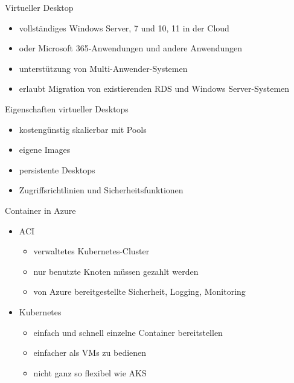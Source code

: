 \begin{flashcard}[]{Virtueller Desktop}
  \begin{itemize}
    \item vollständiges Windows Server, 7 und 10, 11 in der Cloud
    \item oder Microsoft 365-Anwendungen und andere Anwendungen
    \item unterstützung von Multi-Anwender-Systemen
    \item erlaubt Migration von existierenden RDS und Windows Server-Systemen
  \end{itemize}
\end{flashcard}

\begin{flashcard}[]{Eigenschaften virtueller Desktops}
  \begin{itemize}
    \item kostengünstig skalierbar mit Pools
    \item eigene Images
    \item persistente Desktops
    \item Zugriffsrichtlinien und Sicherheitsfunktionen
  \end{itemize}
\end{flashcard}


\begin{flashcard}[]{Container in Azure}
  \begin{itemize}
    \item ACI
      \begin{itemize}
        \item verwaltetes Kubernetes-Cluster
        \item nur benutzte Knoten müssen gezahlt werden
        \item von Azure bereitgestellte Sicherheit, Logging, Monitoring
      \end{itemize}
    \item Kubernetes
      \begin{itemize}
        \item einfach und schnell einzelne Container bereitstellen
        \item einfacher als VMs zu bedienen
        \item nicht ganz so flexibel wie AKS
      \end{itemize}
  \end{itemize}
\end{flashcard}

